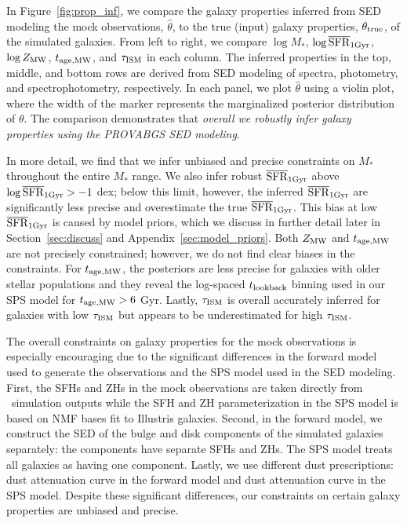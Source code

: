 In Figure~\ref{fig:prop_inf}, we compare the galaxy properties inferred from
SED modeling the mock observations, $\hat{\theta}$, to the true (input) galaxy
properties, $\theta_{\rm true}$, of the simulated galaxies.
From left to right, we compare $\log M_*$, $\log \overline{\rm SFR}_{\rm 1Gyr}$, $\log Z_{\rm MW}$,
$t_{\rm age, MW}$, and $\tau_{\rm ISM}$ in each column.  
The inferred properties in the top, middle, and bottom rows are derived from
SED modeling of spectra, photometry, and spectrophotometry, respectively.
In each panel, we plot $\hat{\theta}$ using a violin plot, where the width
of the marker represents the marginalized posterior distribution of $\theta$. 
The comparison demonstrates that \emph{overall we robustly infer galaxy
properties using the {\sc PROVABGS} SED modeling}. 

In more detail, we find that we infer unbiased and precise constraints on
$M_*$ throughout the entire $M_*$ range. 
We also infer robust $\overline{\rm SFR}_{\rm 1Gyr}$ above $\log \overline{\rm SFR}_{\rm 1Gyr} > -1$ dex; below this limit,
however, the inferred $\overline{\rm SFR}_{\rm 1Gyr}$ are significantly less precise and
overestimate the true $\overline{\rm SFR}_{\rm 1Gyr}$. 
This bias at low $\overline{\rm SFR}_{\rm 1Gyr}$ is caused by model priors, which we discuss in
further detail later in Section~\ref{sec:discuss} and
Appendix~\ref{sec:model_priors}. 
Both $Z_{\rm MW}$ and $t_{\rm age, MW}$ are not precisely constrained; however, we do not
find clear biases in the constraints. 
For $t_{\rm age, MW}$, the posteriors are less precise for galaxies with older stellar
populations and they reveal the log-spaced $t_{\rm lookback}$ binning used in our
SPS model for $t_{\rm age, MW} > 6$ Gyr.
Lastly, $\tau_{\rm ISM}$ is overall accurately inferred for galaxies with low
$\tau_{\rm ISM}$ but appears to be underestimated for high $\tau_{\rm ISM}$.

The overall constraints on galaxy properties for the mock observations is
especially encouraging due to the significant differences in the forward
model used to generate the observations and the SPS model used in the SED
modeling. 
First, the SFHs and ZHs in the mock observations are taken directly from
\lgal~simulation outputs while the SFH and ZH parameterization in the SPS model
is based on NMF bases fit to Illustris galaxies.
Second, in the forward model, we construct the SED of the bulge and disk
components of the simulated galaxies separately: the components have separate
SFHs and ZHs. 
The SPS model treats all galaxies as having one component. 
Lastly, we use different dust prescriptions: \cite{mathis1983} dust
attenuation curve in the forward model and \cite{kriek2013} dust attenuation
curve in the SPS model. 
Despite these significant differences, our constraints on certain galaxy
properties are unbiased and precise. 

